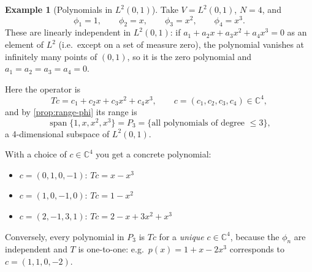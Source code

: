 \documentclass[11pt]{article}
\newcommand{\1}{\mathbf{1}}
\DeclareMathOperator{\Span}{span}
\theoremstyle{notestyle}
\theoremstyle{definition}
\newtheorem{example}[theorem]{Example}
\begin{document}
\begin{example}[Polynomials in $L^2(0, 1)$]
\label{ex:poly-range}
Take $V = L^2(0, 1)$, $N = 4$, and
$$\phi_1 = 1, \qquad \phi_2 = x, \qquad \phi_3 = x^2, \qquad \phi_4 = x^3.$$
These are linearly independent in $L^2(0, 1)$: if $a_1 + a_2 x + a_3 x^2 + a_4 x^3
= 0$ as an element of $L^2$ (i.e.\ except on a set of measure zero), the polynomial
vanishes at infinitely many points of $(0, 1)$, so it is the zero polynomial and
$a_1 = a_2 = a_3 = a_4 = 0$.
\par Here the operator is
$$Tc = c_1 + c_2 x + c_3 x^2 + c_4 x^3, \qquad c = (c_1, c_2, c_3, c_4) \in \mathbb{C}^4,$$
and by \cref{prop:range-phi} its range is
$$\Span\{1, x, x^2, x^3\} = P_3 = \{\text{all polynomials of degree } \le 3\},$$
a 4-dimensional subspace of $L^2(0, 1)$.
\par With a choice of $c \in \mathbb{C}^4$ you get a concrete polynomial:
\begin{itemize}
    \item $c = (0, 1, 0, -1)$: \quad $Tc = x - x^3$
    \item $c = (1, 0, -1, 0)$: \quad $Tc = 1 - x^2$
    \item $c = (2, -1, 3, 1)$: \quad $Tc = 2 - x + 3x^2 + x^3$
\end{itemize}
Conversely, every polynomial in $P_3$ is $Tc$ for a \emph{unique} $c \in
\mathbb{C}^4$, because the $\phi_n$ are independent and $T$ is one-to-one: e.g.\
$p(x) = 1 + x - 2x^3$ corresponds to $c = (1, 1, 0, -2)$.
\begin{center}
\end{center}
\end{example}
\end{document}
